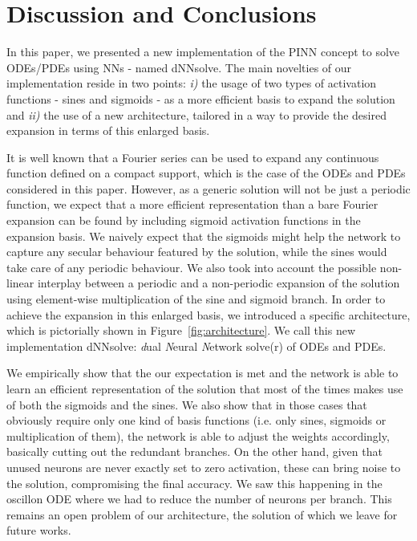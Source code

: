 \documentclass{article}
\begin{document}
\section{Discussion and Conclusions}
\label{sec:Conclusions}

In this paper, we presented a new implementation of the PINN concept to solve ODEs/PDEs using NNs - named \textsf{dNNsolve}. The main novelties of our implementation reside in two points: \textit{i)} the usage of two types of activation functions - sines and sigmoids - as a more efficient basis to expand the solution and \textit{ii)} the use of a new architecture, tailored in a way to provide the desired expansion in terms of this enlarged basis.

It is well known that a Fourier series can be used to expand any continuous function defined on a compact support, which is the case of the ODEs and PDEs considered in this paper. However, as a generic solution will not be just a periodic function, we expect that a more efficient representation than a bare Fourier expansion can be found by including sigmoid activation functions in the expansion basis. We naively expect that the sigmoids might help the network to capture any secular behaviour featured by the solution, while the sines would take care of any periodic behaviour. We also took into account the possible non-linear interplay between a periodic and a non-periodic expansion of the solution using element-wise multiplication of the sine and sigmoid branch. In order to achieve the expansion in this enlarged basis, we introduced a specific architecture, which is pictorially shown in Figure~\ref{fig:architecture}. We call this new implementation \textsf{dNNsolve}: \emph{d}ual \emph{N}eural \emph{N}etwork solve(r) of ODEs and PDEs.

We empirically show that the our expectation is met and the network is able to learn an efficient representation of the solution that most of the times makes use of both the sigmoids and the sines. We also show that in those cases that obviously require only one kind of basis functions (i.e. only sines, sigmoids or multiplication of them), the network is able to adjust the weights accordingly, basically cutting out the redundant branches. On the other hand, given that unused neurons are never exactly set to zero activation, these can bring noise to the solution, compromising the final accuracy. We saw this happening in the oscillon ODE where we had to reduce the number of neurons per branch. This remains an open problem of our architecture, the solution of which we leave for future works.
\end{document}
